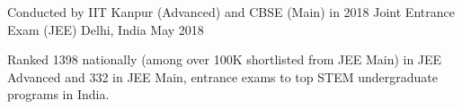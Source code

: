 \begin{cventries}
  \cventry
    {Conducted by IIT Kanpur (Advanced) and CBSE (Main) in 2018} %
    {Joint Entrance Exam (JEE)} %
    {Delhi, India} %
    {May 2018} %
    {
      \begin{cvitems} %
        \item {Ranked 1398 nationally (among over 100K shortlisted from JEE Main) in JEE Advanced and 332 in JEE Main, entrance exams to top STEM undergraduate programs in India.}
      \end{cvitems}
    }


\end{cventries}

